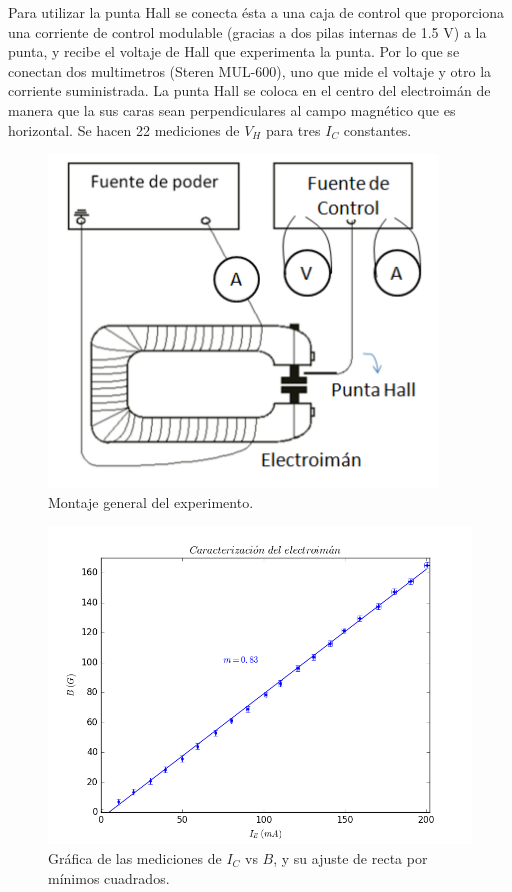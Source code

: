 \documentclass[twocolumn,showpacs,preprintnumbers,amsmath,amssymb]{revtex4-1}
\begin{document}
Para utilizar la punta Hall se conecta ésta a una caja de control que proporciona una corriente de control modulable (gracias a dos
pilas internas de 1.5 V) a la punta, y recibe el voltaje de Hall que experimenta la punta. Por lo que se conectan dos
multimetros (Steren MUL-600), uno que mide el voltaje y otro la corriente suministrada. La punta Hall se coloca en el
centro del electroimán de manera que la sus caras sean perpendiculares al campo magnético que es horizontal.  Se hacen 22
mediciones de $V_H$ para tres $I_C$ constantes.

\begin{figure}
\includegraphics[scale=0.5]{figura_2.png}
\caption{\label{fig:epsart}Montaje general del experimento.}
\end{figure}


\begin{figure}
\includegraphics[scale=0.46]{figura_3.png}
\caption{\label{fig:epsart}Gráfica de las mediciones de $I_C$ vs $B$, y su ajuste de recta por mínimos cuadrados.}
\end{figure}
\end{document}
